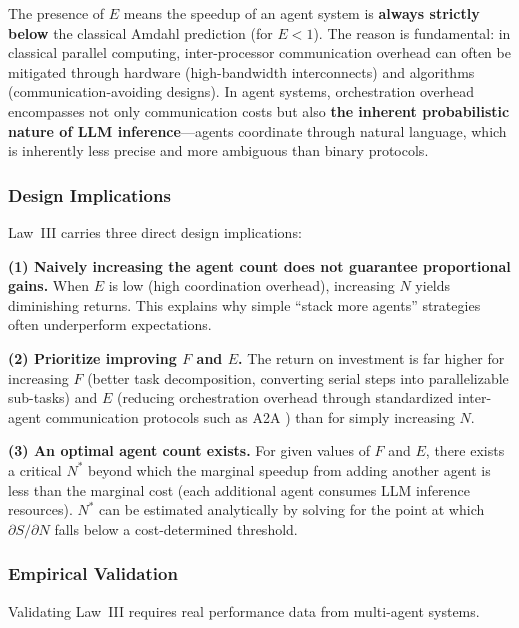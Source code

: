 \documentclass[11pt,a4paper]{article}
\begin{document}
The presence of $E$ means the speedup of an agent system is \textbf{always strictly below} the classical Amdahl prediction (for $E < 1$). The reason is fundamental: in classical parallel computing, inter-processor communication overhead can often be mitigated through hardware (high-bandwidth interconnects) and algorithms (communication-avoiding designs). In agent systems, orchestration overhead encompasses not only communication costs but also \textbf{the inherent probabilistic nature of LLM inference}---agents coordinate through natural language, which is inherently less precise and more ambiguous than binary protocols.

\subsubsection{Design Implications}

Law~III carries three direct design implications:

\textbf{(1) Naively increasing the agent count does not guarantee proportional gains.} When $E$ is low (high coordination overhead), increasing $N$ yields diminishing returns. This explains why simple ``stack more agents'' strategies often underperform expectations.

\textbf{(2) Prioritize improving $F$ and $E$.} The return on investment is far higher for increasing $F$ (better task decomposition, converting serial steps into parallelizable sub-tasks) and $E$ (reducing orchestration overhead through standardized inter-agent communication protocols such as A2A \cite{agentprotocols2025}) than for simply increasing $N$.

\textbf{(3) An optimal agent count exists.} For given values of $F$ and $E$, there exists a critical $N^{*}$ beyond which the marginal speedup from adding another agent is less than the marginal cost (each additional agent consumes LLM inference resources). $N^{*}$ can be estimated analytically by solving for the point at which $\partial S / \partial N$ falls below a cost-determined threshold.

\subsubsection{Empirical Validation}

Validating Law~III requires real performance data from multi-agent systems.
\end{document}
